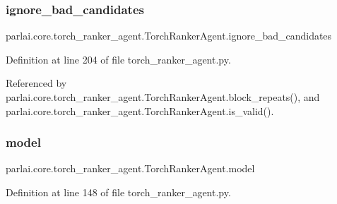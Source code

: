 \subsubsection{\texorpdfstring{ignore\+\_\+bad\+\_\+candidates}{ignore\_bad\_candidates}}
{\footnotesize\ttfamily parlai.\+core.\+torch\+\_\+ranker\+\_\+agent.\+Torch\+Ranker\+Agent.\+ignore\+\_\+bad\+\_\+candidates}



Definition at line 204 of file torch\+\_\+ranker\+\_\+agent.\+py.



Referenced by parlai.\+core.\+torch\+\_\+ranker\+\_\+agent.\+Torch\+Ranker\+Agent.\+block\+\_\+repeats(), and parlai.\+core.\+torch\+\_\+ranker\+\_\+agent.\+Torch\+Ranker\+Agent.\+is\+\_\+valid().

\mbox{\label{classparlai_1_1core_1_1torch__ranker__agent_1_1TorchRankerAgent_a675eab99eca0761267b0d55910487233}} 
\subsubsection{\texorpdfstring{model}{model}}
{\footnotesize\ttfamily parlai.\+core.\+torch\+\_\+ranker\+\_\+agent.\+Torch\+Ranker\+Agent.\+model}



Definition at line 148 of file torch\+\_\+ranker\+\_\+agent.\+py.



